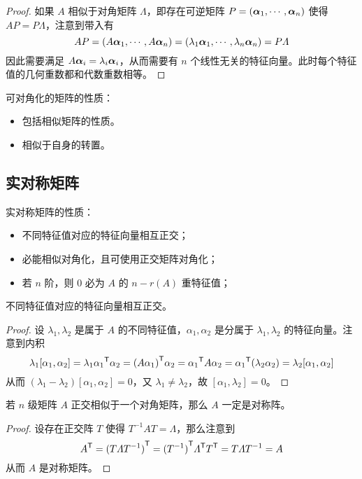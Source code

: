 \begin{proof}
	如果 $A$ 相似于对角矩阵 $\varLambda$，即存在可逆矩阵 $P = (\boldsymbol{\alpha}_1,\cdots,\boldsymbol{\alpha}_n)$ 使得 $AP = P\varLambda$，注意到带入有
	\[ AP = (A\boldsymbol{\alpha}_1,\cdots,A\boldsymbol{\alpha}_n) = (\lambda_1 \boldsymbol{\alpha}_1, \cdots, \lambda_n \boldsymbol{\alpha}_n) = P\varLambda \]
	因此需要满足 $A \boldsymbol{\alpha}_i = \lambda_i \boldsymbol{\alpha}_i$，从而需要有 $n$ 个线性无关的特征向量。此时每个特征值的几何重数都和代数重数相等。
\end{proof}

可对角化的矩阵的性质：
\begin{itemize}
	\item 包括相似矩阵的性质。
	\item 相似于自身的转置。
\end{itemize}

\subsection{实对称矩阵}

实对称矩阵的性质：
\begin{itemize}
	\item 不同特征值对应的特征向量相互正交；
	\item 必能相似对角化，且可使用正交矩阵对角化；
	\item 若 $n$ 阶，则 $0$ 必为 $A$ 的 $n-r(A)$ 重特征值；
\end{itemize}

\begin{theorem}
	不同特征值对应的特征向量相互正交。
\end{theorem}

\begin{proof}
	设 $\lambda_1, \lambda_2$ 是属于 $A$ 的不同特征值，$\alpha_1, \alpha_2$ 是分属于 $\lambda_1, \lambda_2$ 的特征向量。注意到内积
	\[ \lambda_1 [\alpha_1, \alpha_2] = \lambda_1 {\alpha_1}^\mathsf{T} \alpha_2 = {(A \alpha_1)}^\mathsf{T} \alpha_2 = {\alpha_1}^\mathsf{T} A \alpha_2 = {\alpha_1}^\mathsf{T} (\lambda_2 \alpha_2) = \lambda_2 [\alpha_1, \alpha_2] \]
	从而 $(\lambda_1 - \lambda_2)[\alpha_1, \alpha_2] = 0$，又 $\lambda_1 \neq \lambda_2$，故 $[\alpha_1, \lambda_2] = 0$。
\end{proof}

\begin{theorem}
	若 $n$ 级矩阵 $A$ 正交相似于一个对角矩阵，那么 $A$ 一定是对称阵。
\end{theorem}

\begin{proof}
	设存在正交阵 $T$ 使得 $T^{-1}AT = \varLambda$，那么注意到
	\[ {A}^\mathsf{T} = {(T\varLambda T^{-1})}^\mathsf{T} = {(T^{-1})}^\mathsf{T}{\varLambda}^\mathsf{T}{T}^\mathsf{T} = T \varLambda T^{-1} = A \]
	从而 $A$ 是对称矩阵。
\end{proof}

